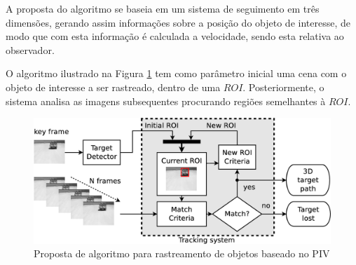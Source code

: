 A proposta do algoritmo se baseia em um sistema de seguimento em três dimensões, gerando assim informações
sobre a posição do objeto de interesse, de modo que com esta informação é calculada a velocidade, 
sendo esta relativa ao observador.

O algoritmo ilustrado na Figura \ref{fig:system} tem como parâmetro inicial uma cena com o
objeto de interesse a ser rastreado, dentro de uma $ROI$. Posteriormente, 
o sistema analisa as imagens subsequentes procurando regiões semelhantes à $ROI$.

\begin{figure}[h]
\includegraphics[width=\columnwidth]{images/figure1-diagram1.eps}
\caption{Proposta de algoritmo para rastreamento de objetos baseado no PIV}
\label{fig:system}
\end{figure}

